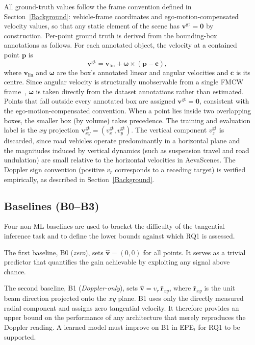 \documentclass[a4paper,12pt]{article}
\begin{document}
All ground-truth values follow the frame convention defined in Section~\ref{Background}: vehicle-frame coordinates and ego-motion-compensated velocity values, so that any static element of the scene has $\mathbf{v}^{\mathrm{gt}} = \mathbf{0}$ by construction. Per-point ground truth is derived from the bounding-box annotations as follows. For each annotated object, the velocity at a contained point $\mathbf{p}$ is
\begin{equation}
    \mathbf{v}^{\mathrm{gt}} = \mathbf{v}_{\mathrm{lin}} + \boldsymbol{\omega} \times (\mathbf{p} - \mathbf{c}),
    \label{eq:gt_velocity}
\end{equation}
where $\mathbf{v}_{\mathrm{lin}}$ and $\boldsymbol{\omega}$ are the box's annotated linear and angular velocities and $\mathbf{c}$ is its centre. Since angular velocity is structurally unobservable from a single FMCW frame~\cite{yoon2023needforspeed}, $\boldsymbol{\omega}$ is taken directly from the dataset annotations rather than estimated. Points that fall outside every annotated box are assigned $\mathbf{v}^{\mathrm{gt}} = \mathbf{0}$, consistent with the ego-motion-compensated convention. When a point lies inside two overlapping boxes, the smaller box (by volume) takes precedence. The training and evaluation label is the $xy$ projection $\mathbf{v}^{\mathrm{gt}}_{xy} = (v_x^{\mathrm{gt}}, v_y^{\mathrm{gt}})$. The vertical component $v_z^{\mathrm{gt}}$ is discarded, since road vehicles operate predominantly in a horizontal plane and the magnitudes induced by vertical dynamics (such as suspension travel and road undulation) are small relative to the horizontal velocities in AevaScenes. The Doppler sign convention (positive $v_r$ corresponds to a receding target) is verified empirically, as described in Section~\ref{Background}.

\subsection{Baselines (B0--B3)}
\label{BaselinesImpl}

Four non-ML baselines are used to bracket the difficulty of the tangential inference task and to define the lower bounds against which RQ1 is assessed.

The first baseline, B0 (\emph{zero}), sets $\hat{\mathbf{v}} = (0, 0)$ for all points. It serves as a trivial predictor that quantifies the gain achievable by exploiting any signal above chance.

The second baseline, B1 (\emph{Doppler-only}), sets $\hat{\mathbf{v}} = v_r\,\hat{\mathbf{r}}_{xy}$, where $\hat{\mathbf{r}}_{xy}$ is the unit beam direction projected onto the $xy$ plane. B1 uses only the directly measured radial component and assigns zero tangential velocity. It therefore provides an upper bound on the performance of any architecture that merely reproduces the Doppler reading. A learned model must improve on B1 in EPE$_t$ for RQ1 to be supported.
\end{document}
